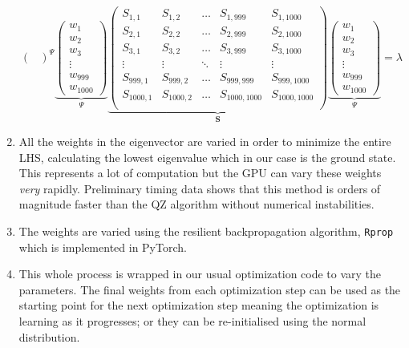 \documentclass[12pt]{article}
\begin{document}
\begin{enumerate}
\begin{equation}
{{\begin{pmatrix}
          \end{pmatrix}}^{\Psi}
         }{\underbrace{
          \begin{pmatrix}
          w_1 \\
          w_2 \\
          w_3 \\
          \vdots \\
          w_{999} \\
          w_{1000}
        \end{pmatrix}}_{\Psi}
        \underbrace{
        \begin{pmatrix}
          S_{1,1} & S_{1,2} & \hdots & S_{1,999} & S_{1,1000}\\
          S_{2,1} & S_{2,2} & \hdots & S_{2,999} & S_{2,1000}\\
          S_{3,1} & S_{3,2} & \hdots & S_{3,999} & S_{3,1000}\\
          \vdots & \vdots & \ddots & \vdots & \vdots \\
          S_{999,1} & S_{999,2} & \hdots & S_{999,999} & S_{999,1000}\\
          S_{1000,1} & S_{1000,2} & \hdots & S_{1000,1000} & S_{1000,1000}\\
        \end{pmatrix}}_{\mathbf{S}}
        \underbrace{
        \begin{pmatrix}
          w_1 \\
          w_2 \\
          w_3 \\
          \vdots \\
          w_{999} \\
          w_{1000}
        \end{pmatrix}}_{\Psi}
        }  = \lambda
  \end{equation}
  \item All the weights in the eigenvector are varied in order to minimize the entire LHS, calculating the lowest eigenvalue which in our case is the ground state. This represents a lot of computation but the GPU can vary these weights \textit{very} rapidly. Preliminary timing data shows that this method is orders of magnitude faster than the QZ algorithm without numerical instabilities.  
  \item The weights are varied using the resilient backpropagation algorithm, \texttt{Rprop} which is implemented in PyTorch.
  \item This whole process is wrapped in our usual optimization code to vary the  parameters. The final weights from each  optimization step can be used as the starting point for the next  optimization step meaning the optimization is learning as it progresses; or they can be re-initialised using the normal distribution. 
\end{enumerate}
\end{document}
